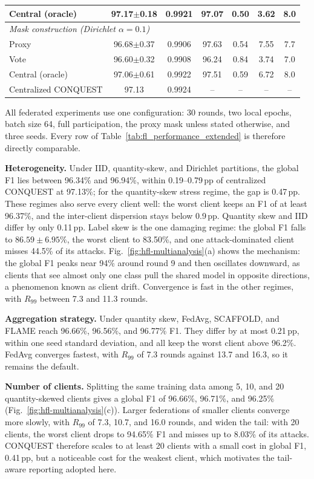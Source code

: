 \documentclass[conference]{IEEEtran}
\begin{document}
\begin{table}[!t]
\begin{tabular}{lcccccc}
Central (oracle) & 97.17$\pm$0.18 & 0.9921 & 97.07 & 0.50 & 3.62 & 8.0 \\
\midrule
\multicolumn{7}{l}{\textit{Mask construction (Dirichlet $\alpha{=}0.1$)}} \\
Proxy & 96.68$\pm$0.37 & 0.9906 & 97.63 & 0.54 & 7.55 & 7.7 \\
Vote & 96.60$\pm$0.32 & 0.9908 & 96.24 & 0.84 & 3.74 & 7.0 \\
Central (oracle) & 97.06$\pm$0.61 & 0.9922 & 97.51 & 0.59 & 6.72 & 8.0 \\
\midrule
Centralized CONQUEST & 97.13 & 0.9924 & -- & -- & -- & -- \\
\hline\toprule
\end{tabular}
\end{table}

All federated experiments
use one configuration: 30 rounds, two local epochs, batch size 64,
full participation, the proxy mask unless stated otherwise, and three
seeds. Every row of Table~\ref{tab:fl_performance_extended} is
therefore directly comparable.

\textbf{Heterogeneity.} Under IID,
quantity-skew, and Dirichlet partitions, the global F1 lies between
96.34\% and 96.94\%, within 0.19--0.79\,pp of centralized CONQUEST at
97.13\%; for the quantity-skew stress regime, the gap is 0.47\,pp.
These regimes also serve every client well: the worst client keeps an
F1 of at least 96.37\%, and the inter-client dispersion stays below
0.9\,pp. Quantity skew and IID differ by only 0.11\,pp. Label skew is the one
damaging regime: the global F1 falls to $86.59\pm6.95\%$, the worst
client to 83.50\%, and one attack-dominated client misses 44.5\% of
its attacks. Fig.~\ref{fig:hfl-multianalysis}(a) shows the mechanism:
the global F1 peaks near 94\% around round 9 and then oscillates
downward, as clients that see almost only one class pull the shared
model in opposite directions, a phenomenon known as client drift.
Convergence is fast in the other regimes, with $R_{99}$ between 7.3
and 11.3 rounds.

\textbf{Aggregation
strategy.} Under quantity skew, FedAvg, SCAFFOLD, and FLAME reach
96.66\%, 96.56\%, and 96.77\% F1. They differ by at most 0.21\,pp,
within one seed standard deviation, and all keep the worst client
above 96.2\%. FedAvg converges fastest, with $R_{99}$ of 7.3 rounds
against 13.7 and 16.3, so it remains the default.

\textbf{Number of clients.} Splitting the
same training data among 5, 10, and 20 quantity-skewed clients gives a
global F1 of 96.66\%, 96.71\%, and 96.25\%
(Fig.~\ref{fig:hfl-multianalysis}(c)). Larger federations of smaller
clients converge more slowly, with $R_{99}$ of 7.3, 10.7, and 16.0
rounds, and widen the tail: with 20 clients, the worst client drops to
94.65\% F1 and misses up to 8.03\% of its attacks. CONQUEST therefore
scales to at least 20 clients with a small cost in global F1,
0.41\,pp, but a noticeable cost for the weakest client, which
motivates the tail-aware reporting adopted here.
\end{document}
